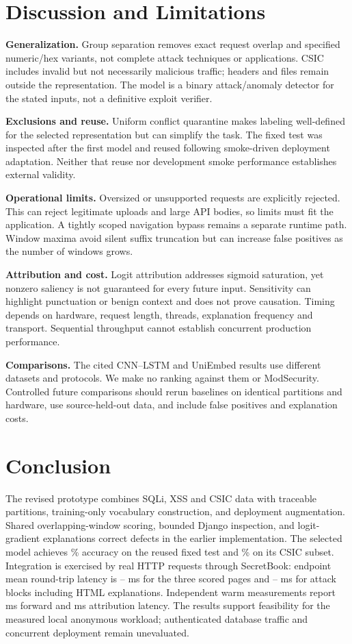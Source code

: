 \documentclass[conference]{IEEEtran}
\begin{document}
\section{Discussion and Limitations}
\textbf{Generalization.} Group separation removes exact request overlap and specified numeric/hex variants, not complete attack techniques or applications. CSIC includes invalid but not necessarily malicious traffic; headers and files remain outside the representation. The model is a binary attack/anomaly detector for the stated inputs, not a definitive exploit verifier.

\textbf{Exclusions and reuse.} Uniform conflict quarantine makes labeling well-defined for the selected representation but can simplify the task. The fixed test was inspected after the first model and reused following smoke-driven deployment adaptation. Neither that reuse nor development smoke performance establishes external validity.

\textbf{Operational limits.} Oversized or unsupported requests are explicitly rejected. This can reject legitimate uploads and large API bodies, so limits must fit the application. A tightly scoped navigation bypass remains a separate runtime path. Window maxima avoid silent suffix truncation but can increase false positives as the number of windows grows.

\textbf{Attribution and cost.} Logit attribution addresses sigmoid saturation, yet nonzero saliency is not guaranteed for every future input. Sensitivity can highlight punctuation or benign context and does not prove causation. Timing depends on hardware, request length, threads, explanation frequency and transport. Sequential throughput cannot establish concurrent production performance.

\textbf{Comparisons.} The cited CNN--LSTM and UniEmbed results use different datasets and protocols. We make no ranking against them or ModSecurity. Controlled future comparisons should rerun baselines on identical partitions and hardware, use source-held-out data, and include false positives and explanation costs.

\section{Conclusion}
The revised prototype combines SQLi, XSS and CSIC data with traceable partitions, training-only vocabulary construction, and deployment augmentation. Shared overlapping-window scoring, bounded Django inspection, and logit-gradient explanations correct defects in the earlier implementation. The selected model achieves \TestAccuracy{}\% accuracy on the reused fixed test and \CsicAccuracy{}\% on its CSIC subset. Integration is exercised by \SecretBookRequests{} real HTTP requests through SecretBook: endpoint mean round-trip latency is \SecretBookPageMin{}--\SecretBookPageMax{} ms for the three scored pages and \SecretBookBlockMin{}--\SecretBookBlockMax{} ms for attack blocks including HTML explanations. Independent warm measurements report \ForwardMean{} ms forward and \XaiMean{} ms attribution latency. The results support feasibility for the measured local anonymous workload; authenticated database traffic and concurrent deployment remain unevaluated.
\end{document}
